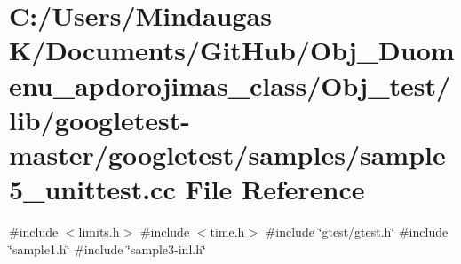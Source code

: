 \hypertarget{_obj__test_2lib_2googletest-master_2googletest_2samples_2sample5__unittest_8cc}{}\section{C\+:/\+Users/\+Mindaugas K/\+Documents/\+Git\+Hub/\+Obj\+\_\+\+Duomenu\+\_\+apdorojimas\+\_\+class/\+Obj\+\_\+test/lib/googletest-\/master/googletest/samples/sample5\+\_\+unittest.cc File Reference}
\label{_obj__test_2lib_2googletest-master_2googletest_2samples_2sample5__unittest_8cc}
{\ttfamily \#include $<$limits.\+h$>$}\newline
{\ttfamily \#include $<$time.\+h$>$}\newline
{\ttfamily \#include \char`\"{}gtest/gtest.\+h\char`\"{}}\newline
{\ttfamily \#include \char`\"{}sample1.\+h\char`\"{}}\newline
{\ttfamily \#include \char`\"{}sample3-\/inl.\+h\char`\"{}}\newline

